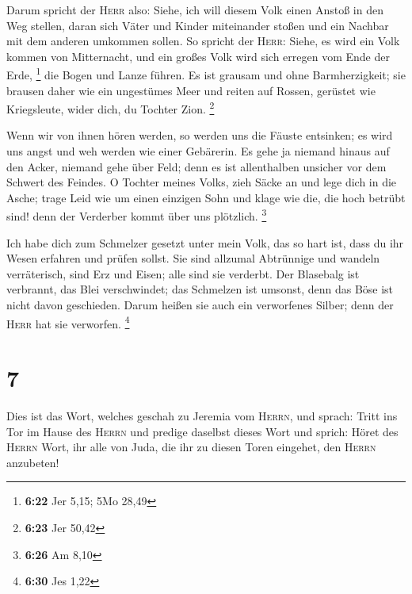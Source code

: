  Darum spricht der \textsc{Herr} also: Siehe, ich will
diesem Volk einen Anstoß in den Weg stellen, daran sich Väter und Kinder
miteinander stoßen und ein Nachbar mit dem anderen umkommen sollen.
 So spricht der \textsc{Herr}: Siehe, es wird ein Volk
kommen von Mitternacht, und ein großes Volk wird sich erregen vom Ende
der Erde, \footnote{\textbf{6:22} Jer 5,15; 5Mo 28,49} 
die Bogen und Lanze führen. Es ist grausam und ohne Barmherzigkeit; sie
brausen daher wie ein ungestümes Meer und reiten auf Rossen, gerüstet
wie Kriegsleute, wider dich, du Tochter Zion. \footnote{\textbf{6:23}
  Jer 50,42}

 Wenn wir von ihnen hören werden, so werden uns die
Fäuste entsinken; es wird uns angst und weh werden wie einer Gebärerin.
 Es gehe ja niemand hinaus auf den Acker, niemand gehe
über Feld; denn es ist allenthalben unsicher vor dem Schwert des
Feindes.  O Tochter meines Volks, zieh Säcke an und lege
dich in die Asche; trage Leid wie um einen einzigen Sohn und klage wie
die, die hoch betrübt sind! denn der Verderber kommt über uns plötzlich.
\footnote{\textbf{6:26} Am 8,10}

 Ich habe dich zum Schmelzer gesetzt unter mein Volk, das
so hart ist, dass du ihr Wesen erfahren und prüfen sollst.
 Sie sind allzumal Abtrünnige und wandeln verräterisch,
sind Erz und Eisen; alle sind sie verderbt.  Der
Blasebalg ist verbrannt, das Blei verschwindet; das Schmelzen ist
umsonst, denn das Böse ist nicht davon geschieden.  Darum
heißen sie auch ein verworfenes Silber; denn der \textsc{Herr} hat sie
verworfen. \footnote{\textbf{6:30} Jes 1,22}

\hypertarget{section-1}{%
\section{7}\label{section-1}}

 Dies ist das Wort, welches geschah zu Jeremia vom
\textsc{Herrn}, und sprach:  Tritt ins Tor im Hause des
\textsc{Herrn} und predige daselbst dieses Wort und sprich: Höret des
\textsc{Herrn} Wort, ihr alle von Juda, die ihr zu diesen Toren
eingehet, den \textsc{Herrn} anzubeten!

